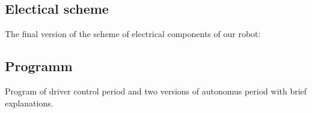 \subsection{Electical scheme}
The final version of the scheme of electrical components of our robot:
\begin{figure}[H]
	\begin{minipage}[h]{1\linewidth}
	\end{minipage}
\end{figure}
\newpage

\subsection{Programm}

Program of driver control period and two versions of autonomus period with brief explanations.
